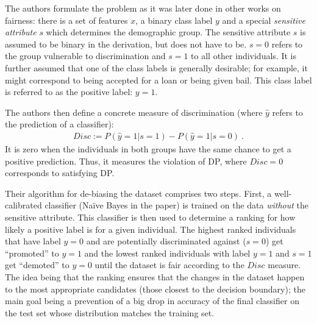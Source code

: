 The authors formulate the problem as it was later done in other works on fairness:
there is a set of features \(x\), a binary class label \(y\)
and a special \emph{sensitive attribute} \(s\) which determines the demographic group.
The sensitive attribute \(s\) is assumed to be binary in the derivation,
but does not have to be.
\(s=0\) refers to the group vulnerable to discrimination and \(s=1\) to all other individuals.
It is further assumed that one of the class labels is generally desirable;
for example, it might correspond to being accepted for a loan or being given bail.
This class label is referred to as the positive label: \(y = 1\).

The authors then define a concrete measure of discrimination (where $\hat{y}$ refers to the prediction of a classifier):
\begin{align}
  \label{eq:disc}
  Disc := P(\hat{y}=1|s =1) - P(\hat{y}=1|s = 0)~.
\end{align}
It is zero when the individuals in both groups have the same chance to get a positive prediction.
Thus, it measures the violation of \ac{DP}, where $Disc=0$ corresponds to satisfying \ac{DP}.

Their algorithm for de-biasing the dataset comprises two steps.
First, a well-calibrated classifier (Na\"ive Bayes in the paper) is trained on the data
\emph{without} the sensitive attribute.
This classifier is then used to determine a ranking for how likely a positive label is for a given individual.
The highest ranked individuals that have label \(y=0\)
and are potentially discriminated against (\(s=0\)) get ``promoted'' to \(y=1\)
and the lowest ranked individuals with label \(y=1\) and \(s=1\) get ``demoted'' to \(y=0\)
until the dataset is fair according to the \(Disc\) measure.
The idea being that the ranking ensures that the changes in the dataset
happen to the most appropriate candidates (those closest to the decision boundary);
the main goal being a prevention of a big drop in accuracy of the final classifier
on the test set whose distribution matches the training set.


